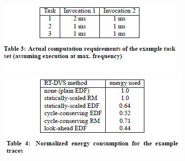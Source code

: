 \documentclass[11pt
  , a4paper
  , article
  , oneside
]{memoir}
\begin{document}
\begin{figure}[h!]
	\centering
	\includegraphics{./images/table3.png}
	\includegraphics{./images/table4.png}
\end{figure}
\end{document}
